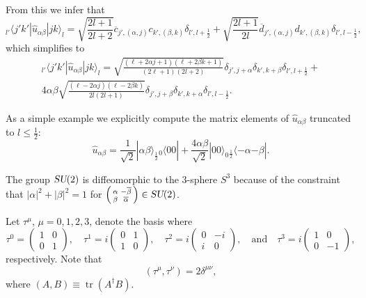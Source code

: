 \documentclass[12pt]{amsart}
\newcommand{\tr}{\operatorname{tr}}
\def\su2{\textsl{SU}(2)}
\theoremstyle{definition}
\theoremstyle{remark}
\numberwithin{equation}{section}
\begin{document}
From this we infer that
\begin{equation}
	_{l'}\langle j'k'|\widehat{u}_{\alpha\beta}|jk\rangle_{l} = \sqrt{\frac{2l+1}{2l+2}} \overline{c}_{j',(\alpha,j)}c_{k',(\beta,k)}\delta_{l',l+\frac12}  + \sqrt{\frac{2l+1}{2l}}\overline{d}_{j',(\alpha,j)}d_{k',(\beta,k)} \delta_{l',l-\frac12},
\end{equation}
which simplifies to
\begin{multline}
	_{l'}\langle j'k'|\widehat{u}_{\alpha\beta}|jk\rangle_{l} = \sqrt{\frac{(\ell+2\alpha j + 1)(\ell+2\beta k + 1)}{(2\ell+1)(2l+2)}} \delta_{j', j + \alpha}\delta_{k', k + \beta}\delta_{l',l+\frac12}  + \\
	4\alpha\beta\sqrt{\frac{(\ell-2\alpha j)(\ell-2\beta k)}{2l(2l+1)}}\delta_{j', j+\beta}\delta_{k', k+\alpha}\delta_{l',l-\frac12}.
\end{multline}

As a simple example we explicitly compute the matrix elements of $\widehat{u}_{\alpha\beta}$ truncated to $l\le \frac12$:
\begin{equation}
	\widehat{u}_{\alpha\beta} = \frac{1}{\sqrt{2}}|\alpha\beta\rangle_{\frac12}{}_0\langle 00| + \frac{4\alpha\beta}{\sqrt2}|00\rangle_{0}{}_{\frac12}\langle {-\alpha}{-\beta}|.
\end{equation}

The group $\su2$ is diffeomorphic to the $3$-sphere $S^3$ because of the constraint that $|\alpha|^2 + |\beta|^2 = 1$ for $\left(\begin{smallmatrix}\alpha & -\overline{\beta} \\ \beta & \overline{\alpha} \end{smallmatrix}\right) \in \su2$. 

Let $\tau^\mu$, $\mu= 0, 1, 2, 3$, denote the basis where
\begin{equation}
	\tau^0 =\begin{pmatrix}1 & 0 \\ 0 & 1\end{pmatrix}, \quad \tau^1 = {i}\begin{pmatrix} 0& 1\\ 1 & 0\end{pmatrix}, \quad \tau^2 = i\begin{pmatrix} 0& -i\\ i & 0\end{pmatrix}, \quad \text{and} \quad \tau^3 = {i}\begin{pmatrix} 1 & 0\\ 0 & -1\end{pmatrix},
\end{equation}
respectively. Note that
\begin{equation}
	(\tau^{\mu},\tau^{\nu}) = 2\delta^{\mu\nu}, 
\end{equation}
where $(A,B) \equiv \tr(A^\dag B)$.
\end{document}
